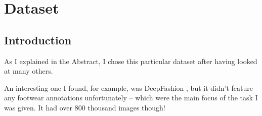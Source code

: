 \chapter{Dataset}\label{s:ds}

\section{Introduction}\label{s:ds-intro}

As I explained in the Abstract, I chose this particular dataset after having looked at many others.

An interesting one I found, for example, was DeepFashion \cite{DeepFashion2}, but it didn't feature any footwear annotations unfortunately -- which were the main focus of the task I was given. It had over 800 thousand images though!

